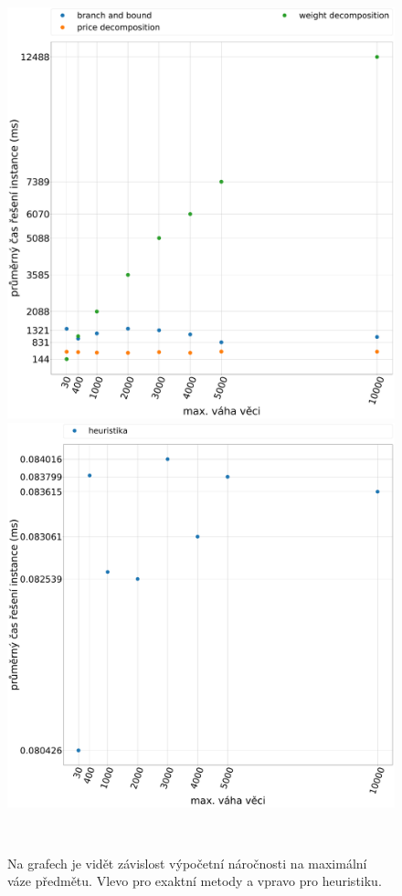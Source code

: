 \documentclass[11pt]{article}
\begin{document}
\begin{figure}
	\centering
    \begin{minipage}[c]{0.49\textwidth}
        \centering\includegraphics[width=\textwidth]{img/WE.pdf} 
    \end{minipage}
    \begin{minipage}[c]{0.49\textwidth}
        \centering \includegraphics[width=\textwidth]{img/WH.pdf} 
    \end{minipage}
    \\
   \caption{Na grafech je vidět závislost výpočetní náročnosti na maximální váze předmětu. Vlevo pro exaktní metody a vpravo pro heuristiku.}\label{fig:CI}
    \end{figure} 
        
\end{document}
